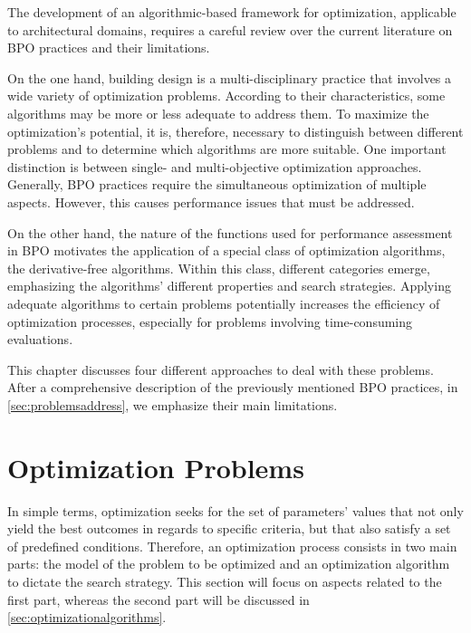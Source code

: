 \label{chap:back}

	The development of an algorithmic-based framework for optimization, applicable to architectural domains, requires a careful review over the current literature on \ac{BPO} practices and their limitations.
	
	On the one hand, building design is a multi-disciplinary practice that involves a wide variety of optimization problems. According to their characteristics, some algorithms may be more or less adequate to address them. To maximize the optimization's potential, it is, therefore, necessary to distinguish between different problems and to determine which algorithms are more suitable. One important distinction is between single- and multi-objective optimization approaches. Generally, \ac{BPO} practices require the simultaneous optimization of multiple aspects. However, this causes performance issues that must be addressed. 
	
	On the other hand, the nature of the functions used for performance assessment in \ac{BPO} motivates the application of a special class of optimization algorithms, the derivative-free algorithms. Within this class, different categories emerge, emphasizing the algorithms' different properties and search strategies. Applying adequate algorithms to certain problems potentially increases the efficiency of optimization processes, especially for problems involving time-consuming evaluations.
	
	This chapter discusses four different approaches to deal with these problems. After a comprehensive description of the previously mentioned \ac{BPO} practices, in \cref{sec:problemsaddress}, we emphasize their main limitations. 
	
\section{Optimization Problems}
\label{sec:optimizationproblems}
	
	In simple terms, optimization seeks for the set of parameters' values that not only yield the best outcomes in regards to specific criteria, but that also satisfy a set of predefined conditions. Therefore, an optimization process consists in two main parts: the model of the problem to be optimized and an optimization algorithm to dictate the search strategy. This section  will focus on aspects related to the first part, whereas the second part will be discussed in \cref{sec:optimizationalgorithms}.
	
